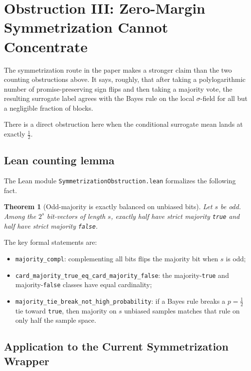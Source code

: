 \documentclass[11pt]{article}
\newtheorem{theorem}{Theorem}[section]
\theoremstyle{remark}
\begin{document}
\section{Obstruction III: Zero-Margin Symmetrization Cannot Concentrate}

The symmetrization route in the paper makes a stronger claim than the two counting obstructions
above.  It says, roughly, that after taking a polylogarithmic number of promise-preserving sign
flips and then taking a majority vote, the resulting surrogate label agrees with the Bayes rule on
the local $\sigma$-field for all but a negligible fraction of blocks.

There is a direct obstruction here when the conditional surrogate mean lands at exactly
\(\tfrac12\).

\subsection{Lean counting lemma}

The Lean module \texttt{SymmetrizationObstruction.lean} formalizes the following fact.

\begin{theorem}[Odd-majority is exactly balanced on unbiased bits]
Let \(s\) be odd.  Among the \(2^s\) bit-vectors of length \(s\), exactly half have strict majority
\texttt{true} and half have strict majority \texttt{false}.
\end{theorem}

\noindent
The key formal statements are:
\begin{itemize}[leftmargin=1.5em]
  \item \texttt{majority\_compl}: complementing all bits flips the majority bit when \(s\) is odd;
  \item \texttt{card\_majority\_true\_eq\_card\_majority\_false}: the majority-\texttt{true} and
  majority-\texttt{false} classes have equal cardinality;
  \item \texttt{majority\_tie\_break\_not\_high\_probability}: if a Bayes rule breaks a
  \(p=\tfrac12\) tie toward \texttt{true}, then majority on \(s\) unbiased samples matches that rule
  on only half the sample space.
\end{itemize}

\subsection{Application to the Current Symmetrization Wrapper}
\end{document}
